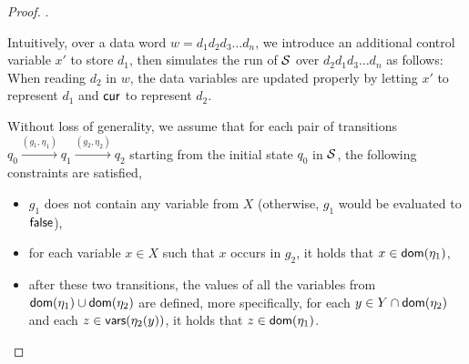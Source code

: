\begin{appendix}
\begin{proof}
\smallskip

.

Intuitively, over a data word $w=d_1d_2 d_3 \dots d_n$, we introduce an additional control variable $x'$ to store $d_1$, then simulates the run of ${\mathcal{S} }$ over $d_2 d_1 d_3 \dots d_n$ as follows: When reading $d_2$ in $w$, the data variables are updated properly by letting $x'$ to represent $d_1$ and $\mathsf{cur}$ to represent $d_2$.

Without loss of generality, we assume that for each pair of transitions $q_0 \xrightarrow{(g_1,\eta_1)} q_1 \xrightarrow{(g_2,\eta_2)} q_2$ starting from the initial state $q_0$ in ${\mathcal{S} }$, the following constraints are satisfied,
\begin{itemize}
\item $g_1$ does not contain any variable from $X$ (otherwise, $g_1$ would be evaluated to $\mathsf{false}$),
%
\item for each variable $x \in X$ such that $x$ occurs in $g_2$, it holds that $x \in \mathsf{dom}(\eta_1)$,
%
\item after these two transitions, the values of all the variables from $\mathsf{dom}(\eta_1) \cup \mathsf{dom}(\eta_2)$ are defined, more specifically, for each $y \in Y \cap \mathsf{dom}(\eta_2)$ and each $z \in \mathsf{vars}(\eta_2(y))$, it holds that $z \in \mathsf{dom}(\eta_1)$.
\end{itemize}


\end{proof}
\end{appendix}
